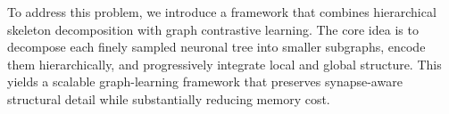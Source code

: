 \documentclass{article}
\begin{document}

To address this problem, we introduce a framework that combines hierarchical skeleton decomposition with graph contrastive learning. The core idea is to decompose each finely sampled neuronal tree into smaller subgraphs, encode them hierarchically, and progressively integrate local and global structure. This yields a scalable graph-learning framework that preserves synapse-aware structural detail while substantially reducing memory cost.

\end{document}
